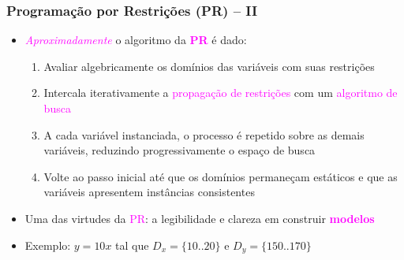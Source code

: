 \documentclass{beamer}
\begin{document}
\begin{frame}[fragile]

\frametitle{Programação por Restrições (PR) -- II}

   \begin{block}{}
     \begin{itemize}
     
      \item \textcolor{magenta}{\textit{Aproximadamente} } o algoritmo da \textbf{\textcolor{magenta}{PR}} é dado:
          \begin{enumerate}

            \item Avaliar algebricamente  os domínios das variáveis com suas restrições

            \item Intercala iterativamente a \textcolor{magenta}{\textsf{propagação de restrições}} com  um \textcolor{magenta}{\textsf{algoritmo de busca}}

            \item A cada variável instanciada, o processo é repetido sobre as demais variáveis, reduzindo progressivamente o espaço de busca

            \item Volte ao passo inicial até que os domínios permaneçam estáticos
            e que as variáveis apresentem instâncias consistentes
              
          \end{enumerate}
       
        \pause
       \item Uma das virtudes da \textcolor{magenta}{PR}: 
       a legibilidade e clareza em construir \textcolor{magenta}{\textbf{modelos} }
       \item Exemplo: $y = 10x$ tal que $D_x = \{10..20\}$ e $D_y =\{150..170\}$
       
    \end{itemize}
    
    \end{block}
    
\end{frame}
\end{document}
